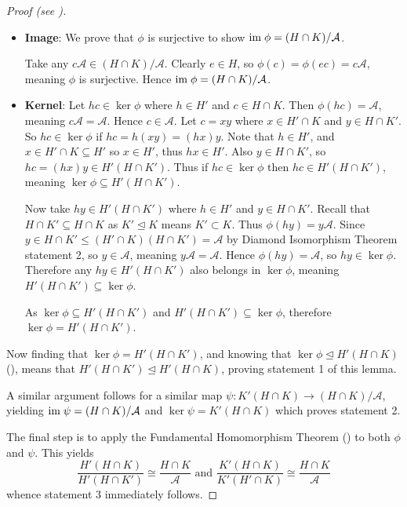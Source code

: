 \begin{proof}[Proof (see {\cite[p.~110]{hungerford_1980}})]
\begin{itemize}
        \item \textbf{Image}: We prove that $\phi$ is surjective to show $\mathrm{im}\; \phi = (H\cap K)/\mathcal{A}$.
        
        Take any $c\mathcal{A} \in (H\cap K) / \mathcal{A}$. Clearly $e \in H$, so $\phi(c) = \phi(ec) = c\mathcal{A}$, meaning $\phi$ is surjective. Hence $\mathrm{im}\; \phi = (H\cap K)/\mathcal{A}$.
        
        \item \textbf{Kernel}: Let $hc \in \ker\phi$ where $h \in H'$ and $c \in H \cap K$. Then $\phi(hc) = \mathcal{A}$, meaning $c\mathcal{A} = \mathcal{A}$. Hence $c \in \mathcal{A}$. Let $c = xy$ where $x \in H'\cap K$ and $y \in H \cap K'$. So $hc \in \ker\phi$ if $hc = h(xy) = (hx)y$. Note that $h \in H'$, and $x \in H' \cap K \subseteq H'$ so $x \in H'$, thus $hx \in H'$. Also $y \in H \cap K'$, so $hc = (hx)y \in H'(H \cap K')$. Thus if $hc \in \ker\phi$ then $hc \in H'(H \cap K')$, meaning $\ker\phi \subseteq H'(H \cap K')$.
        
        Now take $hy \in H'(H \cap K')$ where $h \in H'$ and $y \in H \cap K'$. Recall that $H\cap K' \subseteq H\cap K$ as $K' \unlhd K$ means $K' \subset K$. Thus $\phi(hy) = y\mathcal{A}$. Since $y \in H \cap K' \leq (H' \cap K)(H \cap K') = \mathcal{A}$ by Diamond Isomorphism Theorem statement 2, so $y \in \mathcal{A}$, meaning $y\mathcal{A} = \mathcal{A}$. Hence $\phi(hy) = \mathcal{A}$, so $hy \in \ker\phi$. Therefore any $hy \in H'(H \cap K')$ also belongs in $\ker\phi$, meaning $H'(H \cap K') \subseteq \ker\phi$.
        
        As $\ker\phi \subseteq H'(H\cap K')$ and $H'(H\cap K') \subseteq \ker\phi$, therefore $\ker\phi = H'(H \cap K')$.
    \end{itemize}
    
    Now finding that $\ker\phi = H'(H \cap K')$, and knowing that $\ker\phi \unlhd H'(H\cap K)$ (), means that $H'(H \cap K') \unlhd H'(H\cap K)$, proving statement 1 of this lemma.
    
    A similar argument follows for a similar map $\psi: K'(H\cap K) \to (H\cap K)/\mathcal{A}$, yielding $\mathrm{im}\;\psi = (H\cap K)/\mathcal{A}$ and $\ker\psi = K'(H\cap K)$ which proves statement 2.
    
    The final step is to apply the Fundamental Homomorphism Theorem () to both $\phi$ and $\psi$. This yields
    \[
        \frac{H'(H\cap K)}{H'(H\cap K')} \cong \frac{H\cap K}{\mathcal{A}} 
        \text{ and }
        \frac{K'(H\cap K)}{K'(H'\cap K)} \cong \frac{H\cap K}{\mathcal{A}}
    \]
    whence statement 3 immediately follows.
\end{proof}


